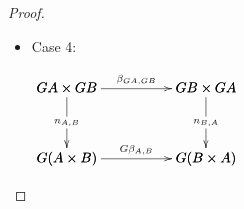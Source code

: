 \begin{proof}
\begin{itemize}
  \item[] Case 4:
    \begin{center}
      \begin{math}
        \bfig
        \square|amma|/->`->`->`->/<1000,500>[
          GA \times GB`
          GB \times GA`
          G(A \times B)`
          G(B \times A);
          {\beta}_{GA,GB}`
          n_{A,B}`
          n_{B,A}`
          G{\beta}_{A,B}]
        \efig
      \end{math}
    \end{center}
  \end{itemize}
\end{proof}
